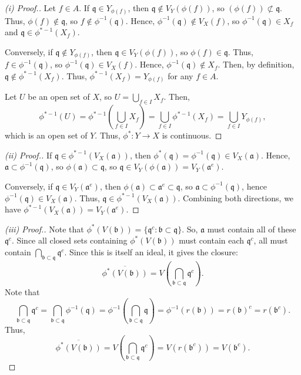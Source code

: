 \begin{proof}[(i) Proof.]
Let $f \in A$. If $\mathfrak{q} \in Y_{\phi(f)}$, then $\mathfrak{q} \not\in V_Y(\phi(f))$, so $(\phi(f)) \not\subset \mathfrak{q}$. Thus,
$\phi(f) \not\in \mathfrak{q}$, so $f \not\in \phi^{-1}(\mathfrak{q})$. Hence, $\phi^{-1}(\mathfrak{q}) \not\in V_X(f)$, so $\phi^{-1}(\mathfrak{q}) \in X_f$ 
and $\mathfrak{q} \in \phi^{*-1}(X_f)$.

Conversely, if $\mathfrak{q} \not\in Y_{\phi(f)}$, then $\mathfrak{q} \in V_Y(\phi(f))$, so $\phi(f) \in \mathfrak{q}$. Thus, $f \in \phi^{-1}(\mathfrak{q})$, so
$\phi^{-1}(\mathfrak{q}) \in V_X(f)$. Hence, $\phi^{-1}(\mathfrak{q}) \not\in X_f$. Then, by definition, $\mathfrak{q} \not\in \phi^{*-1}(X_f)$. Thus, $\phi^{*-1}(X_f) = Y_{\phi(f)}$ for any $f \in A$.

Let $U$ be an open set of $X$, so $U = \bigcup_{f \in I}X_f$. Then,
$$\phi^{*-1}(U) = \phi^{*-1}\left(\bigcup_{f \in I}X_f\right) = \bigcup_{f \in I}\phi^{*-1}(X_f) = \bigcup_{f \in I}Y_{\phi(f)},$$
which is an open set of $Y$. Thus, $\phi^* : Y \to X$ is continuous.
\end{proof}

\begin{proof}[(ii) Proof.]
If $\mathfrak{q} \in \phi^{*-1}(V_X(\mathfrak{a}))$, then $\phi^*(\mathfrak{q}) = \phi^{-1}(\mathfrak{q}) \in V_X(\mathfrak{a})$. Hence,
$\mathfrak{a} \subset \phi^{-1}(\mathfrak{q})$, so $\phi(\mathfrak{a}) \subset \mathfrak{q}$, so 
$\mathfrak{q} \in V_Y(\phi(\mathfrak{a})) = V_Y(\mathfrak{a}^e)$.

Conversely, if $\mathfrak{q} \in V_Y(\mathfrak{a}^e)$, then $\phi(\mathfrak{a}) \subset \mathfrak{a}^e \subset \mathfrak{q}$, so 
$\mathfrak{a} \subset \phi^{-1}(\mathfrak{q})$, hence $\phi^{-1}(\mathfrak{q}) \in V_X(\mathfrak{a})$. Thus, $\mathfrak{q} \in \phi^{*-1}(V_X(\mathfrak{a}))$. 
Combining both directions, we have $\phi^{*-1}(V_X(\mathfrak{a})) = V_Y(\mathfrak{a}^e)$.
\end{proof}

\begin{proof}[(iii) Proof.]
Note that $\phi^*(V(\mathfrak{b})) = \{\mathfrak{q}^c : \mathfrak{b}\subset\mathfrak{q}\}$. So, $\mathfrak{a}$ must contain all of these 
$\mathfrak{q}^c$. Since all closed sets containing $\phi^*(V(\mathfrak{b}))$ must contain each $\mathfrak{q}^c$, all must contain 
$\bigcap_{\mathfrak{b} \subset \mathfrak{q}}\mathfrak{q}^c$. Since this is itself an ideal, it gives the closure:
$$\overline{\phi^*(V(\mathfrak{b}))} = V\left(\bigcap_{\mathfrak{b} \subset \mathfrak{q}}\mathfrak{q}^c\right).$$
Note that 
$$\bigcap_{\mathfrak{b} \subset \mathfrak{q}}\mathfrak{q}^c = \bigcap_{\mathfrak{b} \subset \mathfrak{q}}\phi^{-1}(\mathfrak{q})
= \phi^{-1}\left(\bigcap_{\mathfrak{b} \subset \mathfrak{q}}\mathfrak{q}\right) = \phi^{-1}(r(\mathfrak{b})) = r(\mathfrak{b})^c = r(\mathfrak{b}^c).$$
Thus,
$$\overline{\phi^*(V(\mathfrak{b}))} = V\left(\bigcap_{\mathfrak{b} \subset \mathfrak{q}}\mathfrak{q}^c\right) = V(r(\mathfrak{b}^c)) = V(\mathfrak{b}^c).$$
\end{proof}

